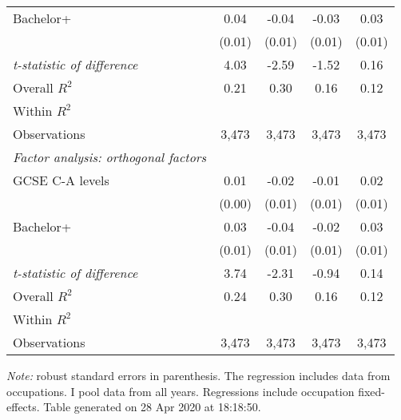 \begin{center}
\begin{threeparttable}[!h]
\begin{tabular}{lcccc}
\hspace{3mm}Bachelor+&        0.04\sym{***}&       -0.04\sym{***}&       -0.03\sym{***}&        0.03\sym{***}\\
                    &      (0.01)         &      (0.01)         &      (0.01)         &      (0.01)         \\
\textit{t-statistic of difference}&        4.03         &       -2.59         &       -1.52         &        0.16         \\
\midrule Overall $ R^2$&        0.21         &        0.30         &        0.16         &        0.12         \\
Within $ R^2$       &                     &                     &                     &                     \\
Observations        &       3,473         &       3,473         &       3,473         &       3,473         \\
\midrule \vspace{1mm}\textit{Factor analysis: orthogonal factors} \\ 
\hspace{3mm}GCSE C-A levels&        0.01\sym{*}  &       -0.02\sym{***}&       -0.01         &        0.02\sym{***}\\
                    &      (0.00)         &      (0.01)         &      (0.01)         &      (0.01)         \\
\hspace{3mm}Bachelor+&        0.03\sym{***}&       -0.04\sym{***}&       -0.02\sym{*}  &        0.03\sym{***}\\
                    &      (0.01)         &      (0.01)         &      (0.01)         &      (0.01)         \\
\textit{t-statistic of difference}&        3.74         &       -2.31         &       -0.94         &        0.14         \\
\midrule Overall $ R^2$&        0.24         &        0.30         &        0.16         &        0.12         \\
Within $ R^2$       &                     &                     &                     &                     \\
Observations        &       3,473         &       3,473         &       3,473         &       3,473         \\
\bottomrule
\bottomrule
\end{tabular}
\begin{tablenotes}
\item \footnotesize \textit{Note:} robust standard errors in parenthesis. The regression includes data from occupations. I pool data from all years. Regressions include occupation fixed-effects. Table generated on 28 Apr 2020 at 18:18:50.
\end{tablenotes}
\end{threeparttable}
\end{center}
